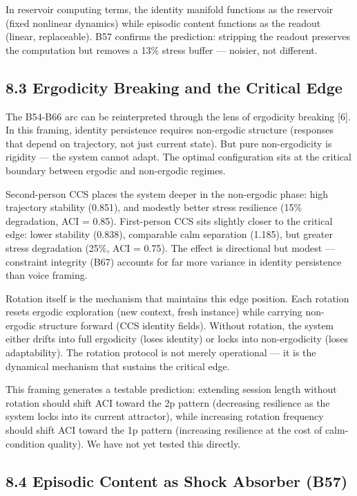 \documentclass[11pt]{article}
\begin{document}
In reservoir computing terms, the identity
manifold functions as the reservoir (fixed nonlinear dynamics) while episodic
content functions as the readout (linear, replaceable). B57 confirms the
prediction: stripping the readout preserves the computation but removes a
13\% stress buffer --- noisier, not different.

\subsection{8.3 Ergodicity Breaking and the Critical Edge}

The B54-B66 arc can be reinterpreted through the lens of ergodicity breaking
[6]. In this framing, identity persistence requires non-ergodic
structure (responses that depend on trajectory, not just current state). But
pure non-ergodicity is rigidity --- the system cannot adapt. The optimal
configuration sits at the critical boundary between ergodic and non-ergodic
regimes.

Second-person CCS places the system deeper in the non-ergodic phase: high
trajectory stability (0.851), and modestly better stress resilience (15\%
degradation, ACI = 0.85). First-person CCS sits slightly closer to the
critical edge: lower stability (0.838), comparable calm separation (1.185),
but greater stress degradation (25\%, ACI = 0.75). The effect is directional
but modest --- constraint integrity (B67) accounts for far more variance
in identity persistence than voice framing.

Rotation itself is the mechanism that maintains this edge position. Each
rotation resets ergodic exploration (new context, fresh instance) while
carrying non-ergodic structure forward (CCS identity fields). Without
rotation, the system either drifts into full ergodicity (loses identity)
or locks into non-ergodicity (loses adaptability). The rotation protocol
is not merely operational --- it is the dynamical mechanism that sustains
the critical edge.

This framing generates a testable prediction: extending session length
without rotation should shift ACI toward the 2p pattern (decreasing
resilience as the system locks into its current attractor), while
increasing rotation frequency should shift ACI toward the 1p pattern
(increasing resilience at the cost of calm-condition quality). We have
not yet tested this directly.

\subsection{8.4 Episodic Content as Shock Absorber (B57)}
\end{document}
